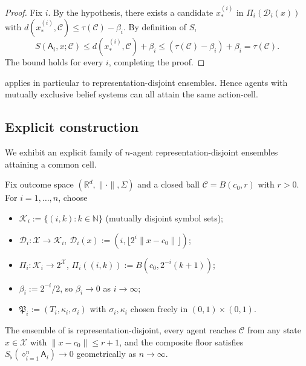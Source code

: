 \documentclass[11pt,twocolumn,a4paper]{article}
\newcommand{\R}{\mathbb{R}}
\newcommand{\N}{\mathbb{N}}
\newcommand{\K}{\mathcal{K}}
\newcommand{\D}{\mathcal{D}}
\newcommand{\X}{\mathcal{X}}
\newcommand{\Cell}{\mathcal{C}}
\newcommand{\Method}{\mathfrak{P}}
\newcommand{\agent}{\mathsf{A}}
\newcommand{\Sfloor}{S_{\flat}}
\newcommand{\norm}[1]{\lVert#1\rVert}
\newcommand{\Compose}{\diamond}
\begin{document}
\begin{proof}
Fix $i$. By the hypothesis, there exists a candidate $x_*^{(i)}$ in
$\Pi_i(\D_i(x))$ with $d(x_*^{(i)},\Cell)\le\tau(\Cell)-\beta_i$. By
definition of $S$,
\[
S(\agent_i,x;\Cell)\le d(x_*^{(i)},\Cell)+\beta_i\le
(\tau(\Cell)-\beta_i)+\beta_i=\tau(\Cell).
\]
The bound holds for every $i$, completing the proof.
\end{proof}

\begin{corollary}
\label{cor:cell-coord}
 applies in particular to representation-disjoint
ensembles. Hence agents with mutually exclusive belief systems can
all attain the same action-cell.
\end{corollary}

\subsection{Explicit construction}

We exhibit an explicit family of $n$-agent representation-disjoint
ensembles attaining a common cell.

\begin{construction}\label{con:disjoint}
Fix outcome space $(\R^d,\norm{\cdot},\Sigma)$ and a closed ball
$\Cell=B(c_0,r)$ with $r>0$. For $i=1,\dots,n$, choose
\begin{itemize}[leftmargin=*]
\item $\K_i:=\{(i,k):k\in\N\}$ (mutually disjoint symbol sets);
\item $\D_i:\X\to\K_i$, $\D_i(x):=(i,\lfloor 2^i\norm{x-c_0}\rfloor)$;
\item $\Pi_i:\K_i\to 2^\X$, $\Pi_i((i,k)):=B(c_0,2^{-i}(k+1))$;
\item $\beta_i:=2^{-i}/2$, so $\beta_i\to 0$ as $i\to\infty$;
\item $\Method_i:=(T_i,\kappa_i,\sigma_i)$ with
$\sigma_i,\kappa_i$ chosen freely in $(0,1)\times(0,1)$.
\end{itemize}
\end{construction}

\begin{proposition}\label{prop:con-valid}
The ensemble of  is representation-disjoint, every
agent reaches $\Cell$ from any state $x\in\X$ with
$\norm{x-c_0}\le r+1$, and the composite floor satisfies
$\Sfloor(\Compose_{i=1}^n\agent_i)\to 0$ geometrically as
$n\to\infty$.
\end{proposition}
\end{document}
